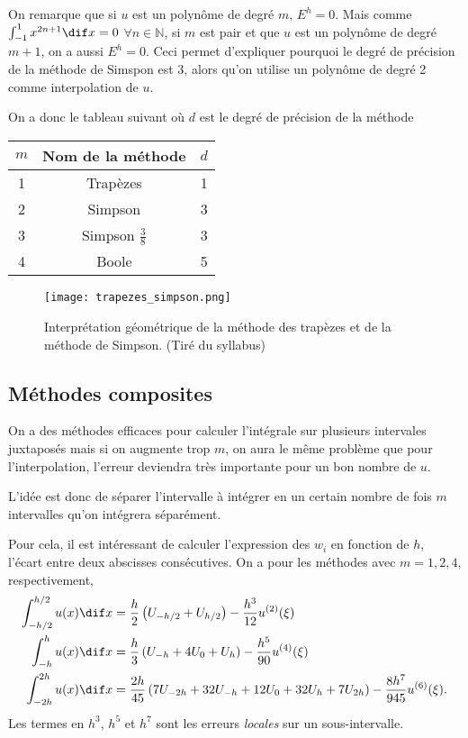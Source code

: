 On remarque que si $u$ est un polynôme de degré $m$, $E^h = 0$.
Mais comme $\int_{-1}^1 x^{2n+1} \dif x = 0$ $\forall n \in \mathbb{N}$,
si $m$ est pair et que $u$ est un polynôme de degré $m+1$,
on a aussi $E^h = 0$. Ceci permet d'expliquer pourquoi le degré
de précision de la méthode de Simspon est 3, alors qu'on utilise
un polynôme de degré 2 comme interpolation de $u$.

On a donc le tableau suivant où $d$ est le degré de précision de la méthode
\begin{center}
  \begin{tabular}{|c|c|c|}
    \hline
    $m$ & Nom de la méthode & $d$\\
    \hline
    1 & Trapèzes & 1\\
    2 & Simpson & 3\\
    3 & Simpson $\frac{3}{8}$ & 3\\
    4 & Boole & 5\\
    \hline
  \end{tabular}
\end{center}

\begin{figure}[ht]
	\centering
	\texttt{[image: trapezes\_simpson.png]}
	\caption{Interprétation géométrique de la méthode des trapèzes et de
	la méthode de Simpson. (Tiré du syllabus)}
	\label{fig:trapeze-simpson}
\end{figure}

\subsection{Méthodes composites}
On a des méthodes efficaces pour calculer l'intégrale sur plusieurs
intervales juxtaposés mais si on augmente trop $m$, on aura le même problème
que pour l'interpolation, l'erreur deviendra très importante pour un bon
nombre de $u$.

L'idée est donc de séparer l'intervalle à intégrer en un certain nombre
de fois $m$ intervalles qu'on intégrera séparément.

Pour cela, il est intéressant de calculer l'expression des $w_i$
en fonction de $h$, l'écart entre deux abscisses consécutives.
On a pour les méthodes avec $m = 1, 2, 4$, respectivement,
\begin{align*}
  \int_{-h/2}^{h/2}u(x)\dif x & =
  \frac{h}{2} \left(U_{-h/2} + U_{h/2}\right)
  -\frac{h^3}{12}u^{(2)}(\xi)\\
  \int_{-h}^{h}u(x)\dif x & =
  \frac{h}{3} \left(U_{-h} + 4 U_0 + U_{h}\right)
  -\frac{h^5}{90}u^{(4)}(\xi)\\
  \int_{-2h}^{2h}u(x)\dif x & =
  \frac{2h}{45}
  \left(7U_{-2h} + 32U_{-h} +12U_0 + 32U_{h} + 7U_{2h}\right)
  -\frac{8h^7}{945}u^{(6)}(\xi).
\end{align*}
Les termes en $h^3$, $h^5$ et $h^7$ sont les erreurs \emph{locales}
sur un sous-intervalle.

